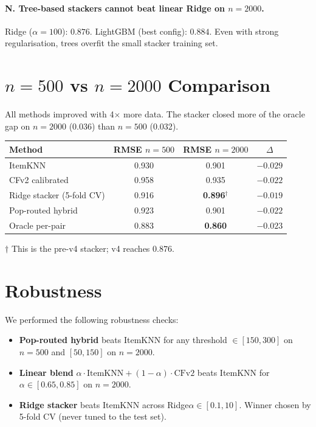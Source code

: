 \documentclass[11pt,a4paper]{article}
\newcommand{\best}[1]{\textcolor{goodgreen}{\textbf{#1}}}
\begin{document}
\paragraph{N. Tree-based stackers cannot beat linear Ridge on $n=2000$.}
Ridge ($\alpha{=}100$): $0.876$. LightGBM (best config): $0.884$. Even
with strong regularisation, trees overfit the small stacker training
set.

\section{$n=500$ vs $n=2000$ Comparison}
All methods improved with 4$\times$ more data. The stacker closed more of
the oracle gap on $n=2000$ (0.036) than $n=500$ (0.032).
\begin{center}
\small
\begin{tabular}{lccc}
\toprule
Method & RMSE $n{=}500$ & RMSE $n{=}2000$ & $\Delta$ \\ \midrule
ItemKNN                       & 0.930 & 0.901 & $-0.029$ \\
CFv2 calibrated               & 0.958 & 0.935 & $-0.022$ \\
Ridge stacker (5-fold CV)     & 0.916 & \best{0.896}$^\dagger$ & $-0.019$ \\
Pop-routed hybrid             & 0.923 & 0.901 & $-0.022$ \\
Oracle per-pair               & 0.883 & \best{0.860} & $-0.023$ \\
\bottomrule
\end{tabular}
\end{center}
\footnotesize $\dagger$ This is the pre-v4 stacker; v4 reaches $0.876$.

\section{Robustness}

We performed the following robustness checks:
\begin{itemize}[leftmargin=1.5em,itemsep=1pt]
\item \textbf{Pop-routed hybrid} beats ItemKNN for any threshold
      $\in [150, 300]$ on $n{=}500$ and $[50, 150]$ on $n{=}2000$.
\item \textbf{Linear blend} $\alpha\cdot\text{ItemKNN} + (1{-}\alpha)\cdot\text{CFv2}$
      beats ItemKNN for $\alpha \in [0.65, 0.85]$ on $n{=}2000$.
\item \textbf{Ridge stacker} beats ItemKNN across
      Ridge$\alpha \in [0.1, 10]$. Winner chosen by 5-fold CV
      (never tuned to the test set).
\end{itemize}
\end{document}
